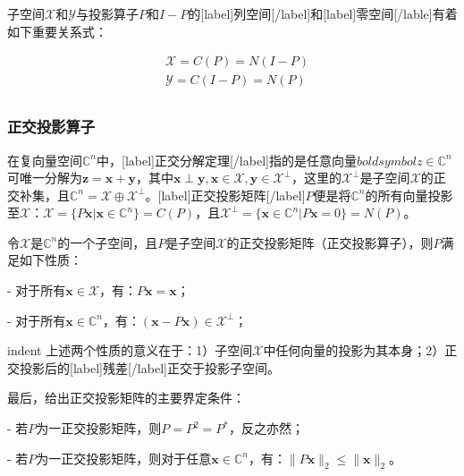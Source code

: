 \documentclass[UTF8,nofonts]{ctexart}
\begin{document}
子空间$\mathcal{X}$和$\mathcal{Y}$与投影算子$P$和$I-P$的[label]列空间[/label]和[label]零空间[/lable]有着如下重要关系式：

\begin{eqnarray*}
& \mathcal{X}=C(P)=N(I-P) \\
& \mathcal{Y}=C(I-P)=N(P) \\
\end{eqnarray*}

\subsubsection*{正交投影算子}

在复向量空间$\mathbb{C}^n$中，[label]正交分解定理[/label]指的是任意向量$boldsymbol{z}\in\mathbb{C}^n$可唯一分解为$\boldsymbol{z}=\boldsymbol{x}+\boldsymbol{y}$，其中$\boldsymbol{x}\perp\boldsymbol{y},\boldsymbol{x}\in\mathcal{X},\boldsymbol{y}\in\mathcal{X}^{\perp}$，这里的$\mathcal{X}^{\perp}$是子空间$\mathcal{X}$的正交补集，且$\mathbb{C}^n=\mathcal{X}\oplus\mathcal{X}^\perp$。[label]正交投影矩阵[/label]$P$便是将$\mathbb{C}^n$的所有向量投影至$\mathcal{X}$：$\mathcal{X}=\{P\boldsymbol{x}|\boldsymbol{x}\in\mathbb{C}^n\}=C(P)$，且$\mathcal{X}^\perp=\{\boldsymbol{x}\in\mathbb{C}^n|P\boldsymbol{x}=0\}=N(P)$。

令$\mathcal{X}$是$\mathbb{C}^n$的一个子空间，且$P$是子空间$\mathcal{X}$的正交投影矩阵（正交投影算子），则$P$满足如下性质：

- 对于所有$\boldsymbol{x}\in\mathcal{X}$，有：$P\boldsymbol{x}=\boldsymbol{x}$；

- 对于所有$\boldsymbol{x}\in\mathbb{C}^n$，有：$(\boldsymbol{x}-P\boldsymbol{x})\in\mathcal{X}^\perp$；

indent 上述两个性质的意义在于：1）子空间$\mathcal{X}$中任何向量的投影为其本身；2）正交投影后的[label]残差[/label]正交于投影子空间。

最后，给出正交投影矩阵的主要界定条件：

- 若$P$为一正交投影矩阵，则$P=P^2=P^*$，反之亦然；

- 若$P$为一正交投影矩阵，则对于任意$\boldsymbol{x}\in\mathbb{C}^n$，有：$\|P\boldsymbol{x}\|_2\leq\|\boldsymbol{x}\|_2$。



\end{document}
